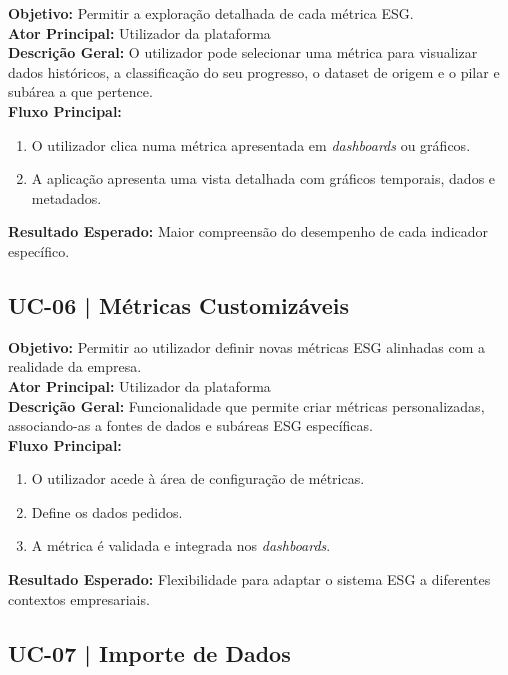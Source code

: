 \textbf{Objetivo:} Permitir a exploração detalhada de cada métrica ESG.\\
\textbf{Ator Principal:} Utilizador da plataforma\\
\textbf{Descrição Geral:} O utilizador pode selecionar uma métrica para visualizar dados históricos, a classificação do seu progresso, o dataset de origem e o pilar e subárea a que pertence.\\
\textbf{Fluxo Principal:}
\begin{enumerate}
    \item O utilizador clica numa métrica apresentada em \textit{dashboards} ou gráficos.
    \item A aplicação apresenta uma vista detalhada com gráficos temporais, dados e metadados.
\end{enumerate}
\textbf{Resultado Esperado:} Maior compreensão do desempenho de cada indicador específico.

\subsection{UC-06 | Métricas Customizáveis}

\textbf{Objetivo:} Permitir ao utilizador definir novas métricas ESG alinhadas com a realidade da empresa.\\
\textbf{Ator Principal:} Utilizador da plataforma\\
\textbf{Descrição Geral:} Funcionalidade que permite criar métricas personalizadas, associando-as a fontes de dados e subáreas ESG específicas.\\
\textbf{Fluxo Principal:}
\begin{enumerate}
    \item O utilizador acede à área de configuração de métricas.
    \item Define os dados pedidos.
    \item A métrica é validada e integrada nos \textit{dashboards}.
\end{enumerate}
\textbf{Resultado Esperado:} Flexibilidade para adaptar o sistema ESG a diferentes contextos empresariais.

\subsection{UC-07 | Importe de Dados}

